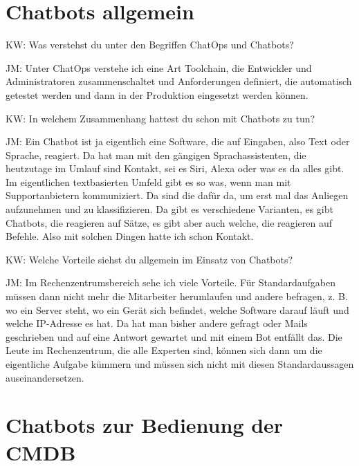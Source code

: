 \section*{Chatbots allgemein}

\begin{list}{X:}{\setlength{\labelsep}{5mm}}
\item[KW:] Was verstehst du unter den Begriffen ChatOps und Chatbots?
\item[JM:] Unter ChatOps verstehe ich eine Art Toolchain, die Entwickler und Administratoren zusammenschaltet und Anforderungen definiert, die automatisch getestet werden und dann in der Produktion eingesetzt werden können.
\item[KW:] In welchem Zusammenhang hattest du schon mit Chatbots zu tun?
\item[JM:] Ein Chatbot ist ja eigentlich eine Software, die auf Eingaben, also Text oder Sprache, reagiert. Da hat man mit den gängigen Sprachassistenten, die heutzutage im Umlauf sind Kontakt, sei es Siri, Alexa oder was es da alles gibt. Im eigentlichen textbasierten Umfeld gibt es so was, wenn man mit Supportanbietern kommuniziert. Da sind die dafür da, um erst mal das Anliegen aufzunehmen und zu klassifizieren. Da gibt es verschiedene Varianten, es gibt Chatbots, die reagieren auf Sätze, es gibt aber auch welche, die reagieren auf Befehle. Also mit solchen Dingen hatte ich schon Kontakt.
\item[KW:] Welche Vorteile siehst du allgemein im Einsatz von Chatbots?
\item[JM:] Im Rechenzentrumsbereich sehe ich viele Vorteile. Für Standardaufgaben müssen dann nicht mehr die Mitarbeiter herumlaufen und andere befragen, z. B. wo ein Server steht, wo ein Gerät sich befindet, welche Software darauf läuft und welche IP-Adresse es hat. Da hat man bisher andere gefragt oder Mails geschrieben und auf eine Antwort gewartet und mit einem Bot entfällt das. Die Leute im Rechenzentrum, die alle Experten sind, können sich dann um die eigentliche Aufgabe kümmern und müssen sich nicht mit diesen Standardaussagen auseinandersetzen.
\end{list}

\section*{Chatbots zur Bedienung der CMDB}

